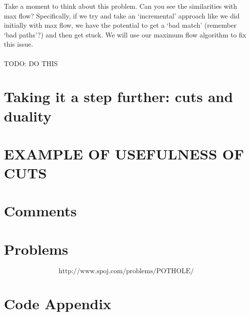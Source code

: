 \documentclass[11pt]{article}
\theoremstyle{plain}
\theoremstyle{definition}
\begin{document}
\newpage \noindent Take a moment to think about this problem. Can you see the similarities with max flow? Specifically, if we try and take an `incremental' approach like we did initially with max flow, we have the potential to get a `bad match' (remember `bad paths'?) and then get stuck. We will use our maximum flow algorithm to fix this issue.
\\\\
\noindent TODO: DO THIS
\section{Taking it a step further: cuts and duality}
\section{EXAMPLE OF USEFULNESS OF CUTS}
\section{Comments}
\section{Problems}
$$\boxed{\text{http://www.spoj.com/problems/POTHOLE/}}$$
\section*{Code Appendix}
\end{document}
